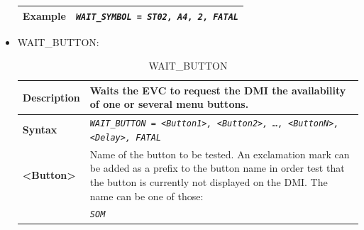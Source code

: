 \begin{itemize}
\begin{longtable}{|l|l|}
					\begin{minipage}[t]{0.22\linewidth} \textbf{Example} \end{minipage}
				&	\begin{minipage}[t]{0.78\linewidth} \emph{\texttt{WAIT\_SYMBOL = ST02, A4, 2, FATAL}} \end{minipage} \\

				\hline \hline

			\end{longtable}

		\item WAIT\_BUTTON:

			\begin{longtable}{|l|l|}
				\caption{WAIT\_BUTTON}\\
				\hline

					\begin{minipage}[t]{0.22\linewidth} \textbf{Description} \end{minipage}
				&	\begin{minipage}[t]{0.78\linewidth} Waits the EVC to request the DMI the availability of one or several menu buttons. \end{minipage} \\

				\hline

					\begin{minipage}[t]{0.22\linewidth} \textbf{Syntax}	\end{minipage}
				&	\begin{minipage}[t]{0.78\linewidth} \emph{\texttt{WAIT\_BUTTON = <Button1>, <Button2>, …, <ButtonN>, <Delay>, FATAL}} \end{minipage} \\

				\hline

					\multirow{1}{*}{ \begin{minipage}[t]{0.22\linewidth} \textbf{<Button>}	\end{minipage} }
				&	\begin{minipage}[t]{0.78\linewidth} Name of the button to be tested. An exclamation mark can be added as a prefix to the button name in order test that the button is currently not displayed on the DMI. The name can be one of those:\end{minipage} \\

				\hline

				&	\begin{minipage}[t]{0.78\linewidth} \emph{\texttt{SOM}} \end{minipage} \\


\end{longtable}
\end{itemize}
